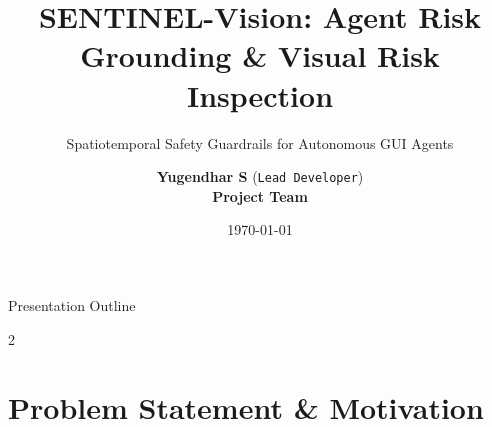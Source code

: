 \documentclass[aspectratio=169, 10pt]{beamer}
\title[SENTINEL-Vision]{SENTINEL-Vision: Agent Risk Grounding \& Visual Risk Inspection}
\subtitle{Spatiotemporal Safety Guardrails for Autonomous GUI Agents}
\author[Yugendhar S]{
    \textbf{Yugendhar S} \quad (\texttt{Lead Developer}) \\
    \textbf{Project Team}
}
\institute[University]{
    Department of Artificial Intelligence \& Data Science \\
}
\date{\today}
\begin{document}

\begin{frame}[plain]
    \titlepage
\end{frame}


\begin{frame}{Presentation Outline}
    \begin{multicols}{2}
        \tableofcontents
    \end{multicols}
\end{frame}


\section{Problem Statement \& Motivation}
\end{document}
